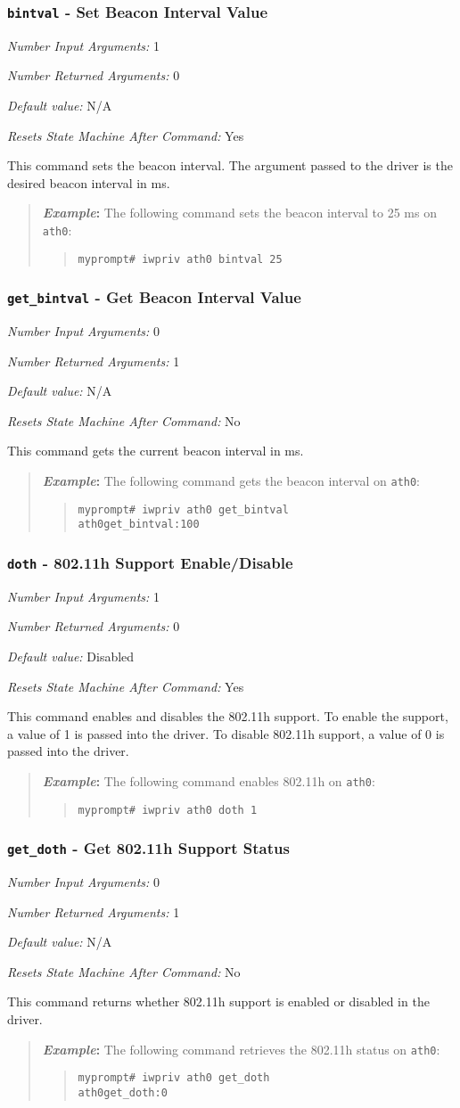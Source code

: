 \documentclass[10pt,fullpage]{article}
\newcommand{\mytt}[1]{{\texttt{#1}}}
\newcommand{\bv}{\begin{verse}}
\newcommand{\ev}{\end{verse}}
\newcommand{\cmd}[1]{{\texttt{myprompt\# #1}}}
\newcommand{\argdesc}[4]{\begin{description}
\itemsep -6pt
\item \textit{Number Input Arguments:} #1
\item \textit{Number Returned Arguments:} #2
\item \textit{Default value:} #3
\item \textit{Resets State Machine After Command:} #4
\end{description}
}
\newenvironment{example}{\begin{quote}\textbf{\textit{Example}:}}{\end{quote}}
\begin{document}
\subsubsection{\mytt{bintval} - Set Beacon Interval Value}
\argdesc{1}{0}{N/A}{Yes}
This command sets the beacon interval.  The argument passed to the
driver is the desired beacon interval in ms.
\begin{example}
  The following command sets the beacon interval to 25 ms on
  \mytt{ath0}:
  \bv
  \cmd{iwpriv ath0 bintval 25}
  \ev
\end{example}

\subsubsection{\mytt{get\_bintval} - Get Beacon Interval Value}
\argdesc{0}{1}{N/A}{No}
This command gets the current beacon interval in ms.
\begin{example}
  The following command gets the beacon interval on \mytt{ath0}:
  \bv
  \cmd{iwpriv ath0 get\_bintval}\\
  \mytt{ath0\hspace{32pt}get\_bintval:100}
  \ev
\end{example}

\subsubsection{\mytt{doth} - 802.11h Support Enable/Disable}
\argdesc{1}{0}{Disabled}{Yes}
This command enables and disables the 802.11h support.  To enable the
support, a value of 1 is passed into the driver. To disable 802.11h
support, a value of 0 is passed into the driver.
\begin{example}
  The following command enables 802.11h on \mytt{ath0}:
  \bv
  \cmd{iwpriv ath0 doth 1}
  \ev
\end{example}

\subsubsection{\mytt{get\_doth} - Get 802.11h Support Status}
\argdesc{0}{1}{N/A}{No}
This command returns whether 802.11h support is enabled or disabled in
the driver.
\begin{example}
  The following command retrieves the 802.11h status on \mytt{ath0}:
  \bv
  \cmd{iwpriv ath0 get\_doth}\\
  \mytt{ath0\hspace{32pt}get\_doth:0}
  \ev
\end{example}
\end{document}
